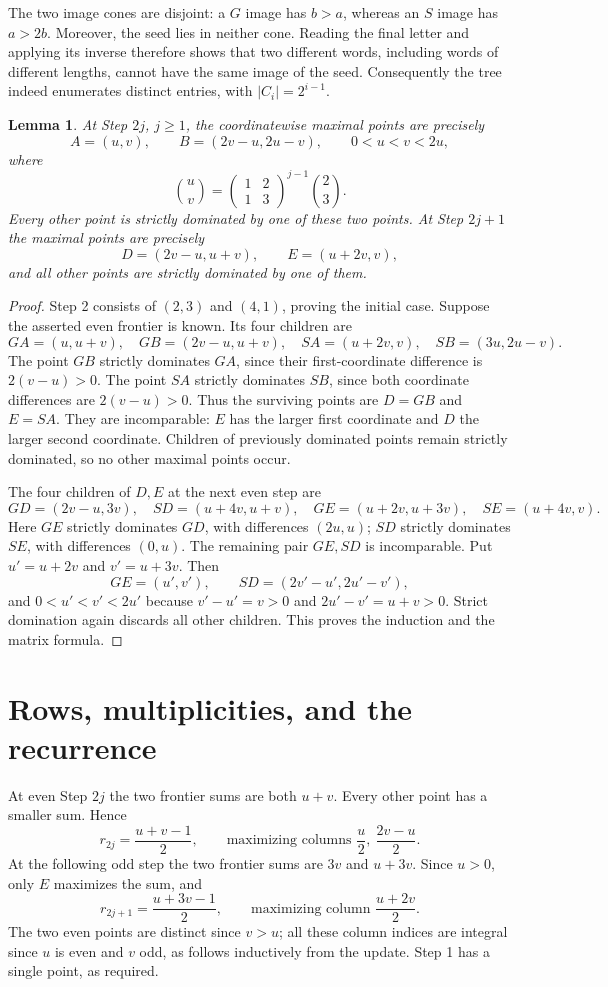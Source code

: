 \documentclass[11pt]{article}
\newtheorem{lemma}{Lemma}
\begin{document}
The two image cones are disjoint: a $G$ image has $b>a$, whereas an
$S$ image has $a>2b$. Moreover, the seed lies in neither cone.
Reading the final letter and applying its inverse therefore shows
that two different words, including words of different lengths,
cannot have the same image of the seed. Consequently the tree
indeed enumerates distinct entries, with $|C_i|=2^{i-1}$.

\begin{lemma}\label{lem:frontier}
At Step $2j$, $j\geq1$, the coordinatewise maximal points are precisely
\[
 A=(u,v),\qquad B=(2v-u,2u-v),\qquad 0<u<v<2u,
\]
where
\[
 \binom{u}{v}=
 \begin{pmatrix}1&2\\1&3\end{pmatrix}^{j-1}\binom{2}{3}.
\]
Every other point is strictly dominated by one of these two points.
At Step $2j+1$ the maximal points are precisely
\[
 D=(2v-u,u+v),\qquad E=(u+2v,v),
\]
and all other points are strictly dominated by one of them.
\end{lemma}

\begin{proof}
Step 2 consists of $(2,3)$ and $(4,1)$, proving the initial case.
Suppose the asserted even frontier is known. Its four children are
\[
 GA=(u,u+v),\quad GB=(2v-u,u+v),\quad
 SA=(u+2v,v),\quad SB=(3u,2u-v).
\]
The point $GB$ strictly dominates $GA$, since their first-coordinate
difference is $2(v-u)>0$. The point $SA$ strictly dominates $SB$,
since both coordinate differences are $2(v-u)>0$.
Thus the surviving points are $D=GB$ and $E=SA$.
They are incomparable: $E$ has the larger first coordinate and
$D$ the larger second coordinate. Children of previously dominated
points remain strictly dominated, so no other maximal points occur.

The four children of $D,E$ at the next even step are
\[
 GD=(2v-u,3v),\quad SD=(u+4v,u+v),\quad
 GE=(u+2v,u+3v),\quad SE=(u+4v,v).
\]
Here $GE$ strictly dominates $GD$, with differences $(2u,u)$;
$SD$ strictly dominates $SE$, with differences $(0,u)$.
The remaining pair $GE,SD$ is incomparable. Put
$u'=u+2v$ and $v'=u+3v$. Then
\[
 GE=(u',v'),\qquad SD=(2v'-u',2u'-v'),
\]
and $0<u'<v'<2u'$ because $v'-u'=v>0$ and
$2u'-v'=u+v>0$. Strict domination again discards all other
children. This proves the induction and the matrix formula.
\end{proof}

\section*{Rows, multiplicities, and the recurrence}
At even Step $2j$ the two frontier sums are both $u+v$.
Every other point has a smaller sum. Hence
\[
 r_{2j}=\frac{u+v-1}{2},\qquad
 \text{maximizing columns }\frac u2,\ \frac{2v-u}{2}.
\]
At the following odd step the two frontier sums are $3v$ and
$u+3v$. Since $u>0$, only $E$ maximizes the sum, and
\[
 r_{2j+1}=\frac{u+3v-1}{2},\qquad
 \text{maximizing column }\frac{u+2v}{2}.
\]
The two even points are distinct since $v>u$; all these column
indices are integral since $u$ is even and $v$ odd, as follows
inductively from the update. Step 1 has a single point, as required.
\end{document}
